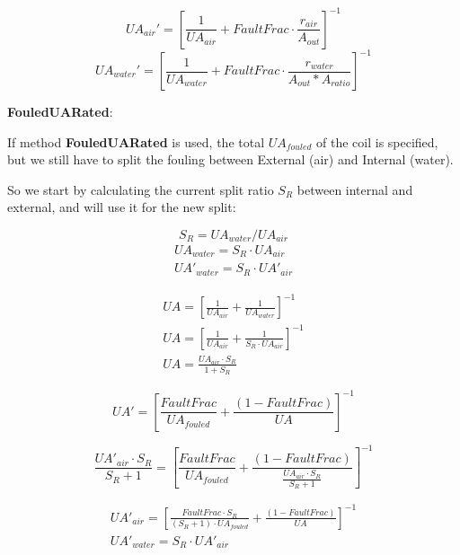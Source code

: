 \begin{equation}
    UA_{air}' = [\frac{1}{UA_{air}} + FaultFrac \cdot \frac{r_{air}}{A_{out}}]^{-1}
\end{equation}
\begin{equation}
    UA_{water}' = [\frac{1}{UA_{water}} + FaultFrac \cdot \frac{r_{water}}{A_{out}*A_{ratio}}]^{-1}
\end{equation}

\textbf{FouledUARated}:

If method \textbf{FouledUARated} is used, the total $UA_{fouled}$ of the coil is specified, but we still have to split the fouling between External (air) and Internal (water).

So we start by calculating the current split ratio $S_R$ between internal and external, and will use it for the new split:

\begin{equation}
    S_R = UA_{water} / UA_{air}
\end{equation}
\begin{equation}
\begin{array}{l}
    UA_{water} = S_R \cdot UA_{air} \\
    UA'_{water} = S_R \cdot UA'_{air}
\end{array}
\end{equation}

\begin{equation}
\begin{array}{l}
    UA = [\frac{1}{UA_{air}} + \frac{1}{UA_{water}}]^{-1} \\
    UA = [\frac{1}{UA_{air}} + \frac{1}{S_R \cdot UA_{air}}]^{-1} \\
    UA = \frac{UA_{air} \cdot S_R}{1 + S_R}
\end{array}
\end{equation}

\begin{equation}
    UA' = [\frac{FaultFrac}{UA_{fouled}}+\frac{(1-FaultFrac)}{UA}]^{-1}
\end{equation}


\begin{equation}
    \frac{UA'_{air} \cdot S_R}{S_R + 1} = [\frac{FaultFrac}{UA_{fouled}}+\frac{(1-FaultFrac)}{\frac{UA_{air} \cdot S_R}{S_R + 1}}]^{-1}
\end{equation}

\begin{equation}
\begin{array}{l}
    UA'_{air} = [\frac{FaultFrac \cdot S_R}{(S_R+1) \cdot UA_{fouled}}+\frac{(1-FaultFrac)}{UA}]^{-1} \\
    UA'_{water} = S_R \cdot UA'_{air}
\end{array}
\end{equation}

